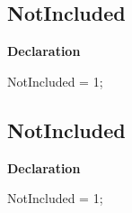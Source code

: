 \documentclass{report}
\begin{document}
\subsection*{NotIncluded}
\begin{list}{}{
\setlength{\itemindent}{0cm}
\setlength{\listparindent}{0cm}
\setlength{\leftmargin}{\evensidemargin}
\addtolength{\leftmargin}{\tmplength}
\settowidth{\labelsep}{X}
\addtolength{\leftmargin}{\labelsep}
\setlength{\labelwidth}{\tmplength}
}
\begin{flushleft}
\item[\textbf{Declaration}\hfill]
\begin{ttfamily}
NotIncluded = 1;\end{ttfamily}


\end{flushleft}
\end{list}
\subsection*{NotIncluded}
\begin{list}{}{
\setlength{\itemindent}{0cm}
\setlength{\listparindent}{0cm}
\setlength{\leftmargin}{\evensidemargin}
\addtolength{\leftmargin}{\tmplength}
\settowidth{\labelsep}{X}
\addtolength{\leftmargin}{\labelsep}
\setlength{\labelwidth}{\tmplength}
}
\begin{flushleft}
\item[\textbf{Declaration}\hfill]
\begin{ttfamily}
NotIncluded = 1;\end{ttfamily}


\end{flushleft}
\end{list}
\end{document}
